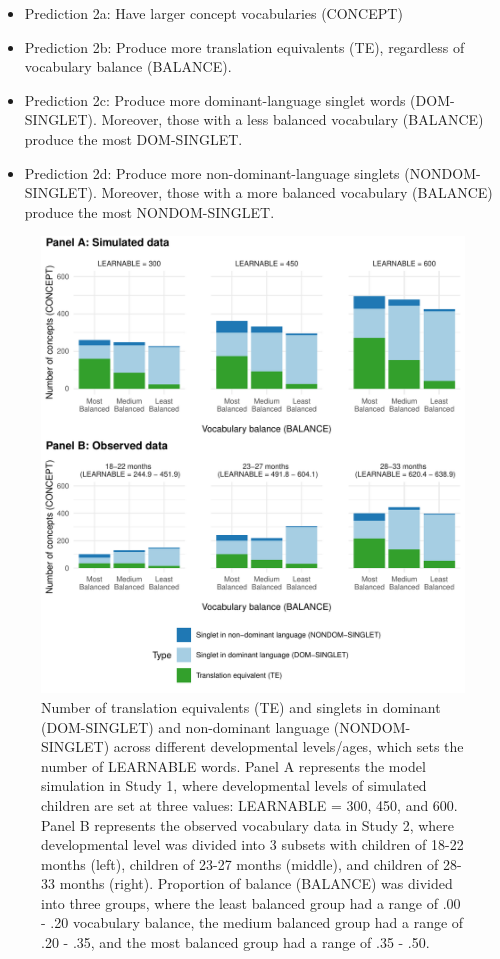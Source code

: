 \documentclass[
  english,
  ,man,floatsintext]{apa6}
\providecommand{\tightlist}{%
  \setlength{\itemsep}{0pt}\setlength{\parskip}{0pt}}
\begin{document}
\begin{itemize}
\tightlist
\item
  Prediction 2a: Have larger concept vocabularies (CONCEPT)
\item
  Prediction 2b: Produce more translation equivalents (TE), regardless of vocabulary balance (BALANCE).
\item
  Prediction 2c: Produce more dominant-language singlet words (DOM-SINGLET). Moreover, those with a less balanced vocabulary (BALANCE) produce the most DOM-SINGLET.
\item
  Prediction 2d: Produce more non-dominant-language singlets (NONDOM-SINGLET). Moreover, those with a more balanced vocabulary (BALANCE) produce the most NONDOM-SINGLET.
\end{itemize}

\begin{figure}

{\centering \includegraphics[width=0.8\linewidth,height=0.8\textheight]{paper_TE_bilingual_vocabulary_model_files/figure-latex/fig3-1} 

}

\caption{Number of translation equivalents (TE) and singlets in dominant (DOM-SINGLET) and non-dominant language (NONDOM-SINGLET) across different developmental levels/ages, which sets the number of LEARNABLE words. Panel A represents the model simulation in Study 1, where developmental levels of simulated children are set at three values: LEARNABLE = 300, 450, and 600. Panel B represents the observed vocabulary data in Study 2, where developmental level was divided into 3 subsets with children of 18-22 months (left), children of 23-27 months (middle), and children of 28-33 months (right). Proportion of balance (BALANCE) was divided into three groups, where the least balanced group had a range of .00 - .20 vocabulary balance, the medium balanced group had a range of .20 - .35, and the most balanced group had a range of .35 - .50.}\label{fig:fig3}
\end{figure}
\end{document}
